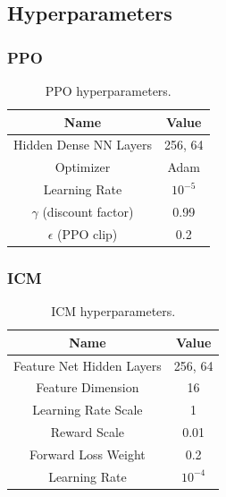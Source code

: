 


\subsection{Hyperparameters}
\label{sec:ng_hyperparameters}

\subsubsection{PPO}

\begin{table}[htbp]
    \centering
    \begin{tabular}{cc}
    \toprule
        Name &  Value  \\
    \midrule
        Hidden Dense NN Layers  & 256, 64\\
        Optimizer & Adam \\
        Learning Rate & $10^{-5}$ \\
        $\gamma$ (discount factor) & 0.99 \\
        $\epsilon$ (PPO clip) & 0.2 \\
    \bottomrule
    \end{tabular}
    \caption{PPO hyperparameters.}
    \label{tab:ppo-param}
\end{table}

\subsubsection{ICM}

\begin{table}[htbp]
    \centering
    \begin{tabular}{cc}
    \toprule
        Name &  Value  \\
    \midrule
        Feature Net Hidden Layers & 256, 64 \\
        Feature Dimension & 16 \\
        Learning Rate Scale & 1 \\
        Reward Scale & 0.01 \\
        Forward Loss Weight & 0.2 \\
        Learning Rate & $10^{-4}$ \\
    \bottomrule
    \end{tabular}
    \caption{ICM hyperparameters.}
    \label{tab:icm-param}
\end{table}

